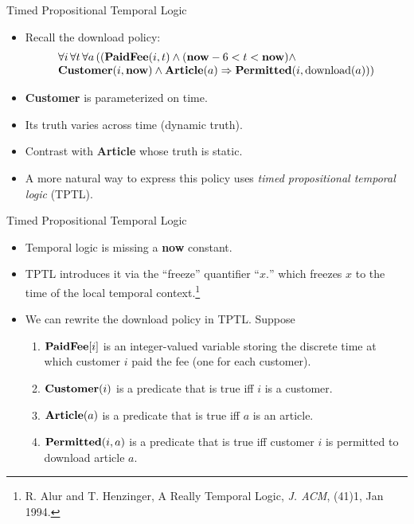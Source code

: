 \documentclass[style=sailor,size=12pt]{powerdot}
\begin{document}
\begin{wideslide}[bm=,toc=]{Timed Propositional Temporal Logic}
\begin{itemize}
\item Recall the download policy:
\begin{displaymath}
\begin{array}{l}
\forall i\, \forall t\, \forall a\, ((\mbox{\bf PaidFee}(i,t)\wedge (\mbox{\bf now} - 6 < t < \mbox{\bf now})\wedge \\
\mbox{\bf Customer}(i,\mbox{\bf now})\wedge\mbox{\bf Article}(a) \Rightarrow \mbox{\bf Permitted}(i,\mbox{\rm download}(a)))
\end{array}
\end{displaymath}
\item {\bf Customer} is parameterized on time.
\item Its truth varies across time (dynamic truth).
\item Contrast with {\bf Article} whose truth is static.
\item A more natural way to express this policy uses {\em timed propositional temporal logic\/} (TPTL).
\end{itemize}
\end{wideslide}

\begin{wideslide}[bm=,toc=]{Timed Propositional Temporal Logic}
\begin{itemize}
\item Temporal logic is missing a {\bf now} constant.
\item TPTL introduces it via the ``freeze'' quantifier ``$x.$'' which freezes $x$ to the
time of the local temporal context.\footnote{
R. Alur and T. Henzinger, A Really Temporal Logic, {\em J. ACM\/},
(41)1, Jan 1994.}
\item We can rewrite the download policy in TPTL.  Suppose
\begin{enumerate}
\item $\mbox{\bf PaidFee}[i]$ is an integer-valued variable storing
the discrete time at which customer $i$ paid the fee (one for each customer).
\item $\mbox{\bf Customer}(i)$ is a predicate that is true iff $i$ is a customer.
\item $\mbox{\bf Article}(a)$ is a predicate that is true iff $a$ is an article.
\item $\mbox{\bf Permitted}(i,a)$ is a predicate that is true iff 
customer $i$ is permitted to download article $a$.
\end{enumerate}
\end{itemize}
\end{wideslide}
\end{document}
